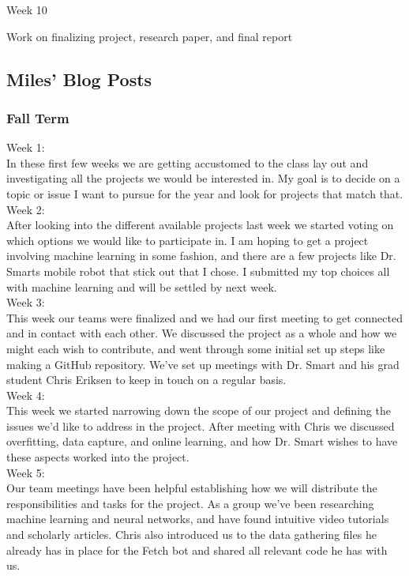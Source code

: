 \documentclass[draftclsnofoot, onecolumn, 10pt, compsoc]{IEEEtran}
\begin{document}
Week 10

  Work on finalizing project, research paper, and final report


  \subsection{Miles' Blog Posts}
  	\subsubsection{Fall Term}
    	Week 1: \\ \indent In these first few weeks we are getting accustomed to the class lay out and investigating all the projects we would be interested in. My goal is to decide on a topic or issue I want to pursue for the year and look for projects that match that. \\
    	Week 2: \\ \indent After looking into the different available projects last week we started voting on which options we would like to participate in. I am hoping to get a project involving machine learning in some fashion, and there are a few projects like Dr. Smarts mobile robot that stick out that I chose. I submitted my top choices all with machine learning and will be settled by next week.\\
    	Week 3: \\ \indent This week our teams were finalized and we had our first meeting to get connected and in contact with each other. We discussed the project as a whole and how we might each wish to contribute, and went through some initial set up steps like making a GitHub repository. We've set up meetings with Dr. Smart and his grad student Chris Eriksen to keep in touch on a regular basis. \\
    	Week 4: \\ \indent This week we started narrowing down the scope of our project and defining the issues we'd like to address in the project. After meeting with Chris we discussed overfitting, data capture, and online learning, and how Dr. Smart wishes to have these aspects worked into the project. \\
    	Week 5: \\ \indent Our team meetings have been helpful establishing how we will distribute the responsibilities and tasks for the project. As a group we've been researching machine learning and neural networks, and have found intuitive video tutorials and scholarly articles. Chris also introduced us to the data gathering files he already has in place for the Fetch bot and shared all relevant code he has with us. \\
\end{document}
